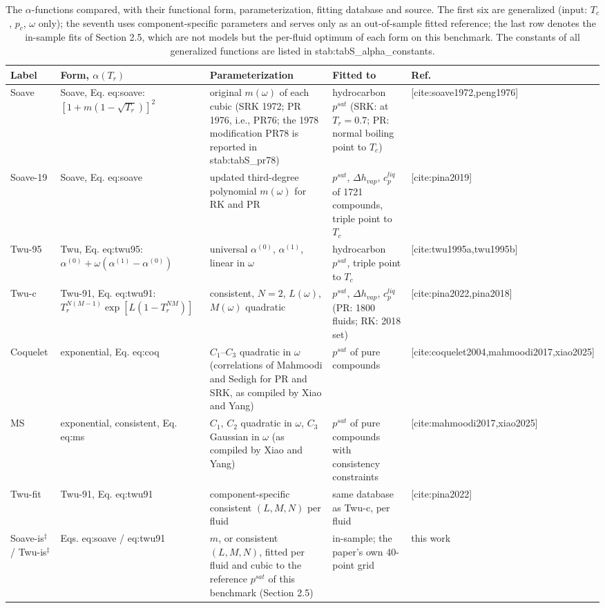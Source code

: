 \begin{table}[H]
\centering
\caption{The $\alpha$-functions compared, with their functional form, parameterization, fitting database and source. The first six are generalized (input: $T_c$, $p_c$, $\omega$ only); the seventh uses component-specific parameters and serves only as an out-of-sample fitted reference; the last row denotes the in-sample fits of Section 2.5, which are not models but the per-fluid optimum of each form on this benchmark. The constants of all generalized functions are listed in {stab:tabS_alpha_constants}.}
\label{tab:tab_models}
\small
\begin{tabular}{p{2.2cm}p{4.2cm}p{4.6cm}p{3.0cm}p{1.4cm}}
\toprule
Label & Form, $\alpha(T_r)$ & Parameterization & Fitted to & Ref. \\
\midrule
Soave & Soave, Eq. {eq:soave}: $[1 + m(1 - \sqrt{T_r})]^2$ & original $m(\omega)$ of each cubic (SRK 1972; PR 1976, i.e., PR76; the 1978 modification PR78 is reported in {stab:tabS_pr78}) & hydrocarbon $p^{sat}$ (SRK: at $T_r = 0.7$; PR: normal boiling point to $T_c$) & [cite:soave1972,peng1976] \\
Soave-19 & Soave, Eq. {eq:soave} & updated third-degree polynomial $m(\omega)$ for RK and PR & $p^{sat}$, $\Delta h_{vap}$, $c_p^{liq}$ of 1721 compounds, triple point to $T_c$ & [cite:pina2019] \\
Twu-95 & Twu, Eq. {eq:twu95}: $\alpha^{(0)} + \omega(\alpha^{(1)} - \alpha^{(0)})$ & universal $\alpha^{(0)}$, $\alpha^{(1)}$, linear in $\omega$ & hydrocarbon $p^{sat}$, triple point to $T_c$ & [cite:twu1995a,twu1995b] \\
Twu-c & Twu-91, Eq. {eq:twu91}: $T_r^{N(M-1)} \exp[L(1 - T_r^{NM})]$ & consistent, $N=2$, $L(\omega)$, $M(\omega)$ quadratic & $p^{sat}$, $\Delta h_{vap}$, $c_p^{liq}$ (PR: 1800 fluids; RK: 2018 set) & [cite:pina2022,pina2018] \\
Coquelet & exponential, Eq. {eq:coq} & $C_1$--$C_3$ quadratic in $\omega$ (correlations of Mahmoodi and Sedigh for PR and SRK, as compiled by Xiao and Yang) & $p^{sat}$ of pure compounds & [cite:coquelet2004,mahmoodi2017,xiao2025] \\
MS & exponential, consistent, Eq. {eq:ms} & $C_1$, $C_2$ quadratic in $\omega$, $C_3$ Gaussian in $\omega$ (as compiled by Xiao and Yang) & $p^{sat}$ of pure compounds with consistency constraints & [cite:mahmoodi2017,xiao2025] \\
Twu-fit & Twu-91, Eq. {eq:twu91} & component-specific consistent $(L, M, N)$ per fluid & same database as Twu-c, per fluid & [cite:pina2022] \\
Soave-is$^{\ddagger}$ / Twu-is$^{\ddagger}$ & Eqs. {eq:soave} / {eq:twu91} & $m$, or consistent $(L, M, N)$, fitted per fluid and cubic to the reference $p^{sat}$ of this benchmark (Section 2.5) & in-sample; the paper's own 40-point grid & this work \\
\bottomrule
\end{tabular}
\end{table}
